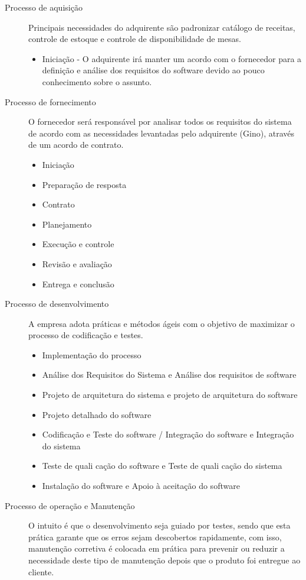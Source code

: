 \begin{description}
  \item [Processo de aquisição] Principais necessidades do adquirente são padronizar catálogo de receitas, controle de estoque e controle de disponibilidade de mesas.
  \begin{itemize}
    \item Iniciação - O adquirente irá manter um acordo com o fornecedor para a definição e análise dos requisitos do software devido ao pouco conhecimento sobre o assunto.
  \end{itemize}
  \item [Processo de fornecimento] O fornecedor será responsável por analisar todos os requisitos do sistema de acordo com as necessidades levantadas pelo adquirente (Gino), através de um acordo de contrato.
  \begin{itemize}
    \item Iniciação
    \item Preparação de resposta
    \item Contrato
    \item Planejamento
    \item Execução e controle
    \item Revisão e avaliação
    \item Entrega e conclusão
  \end{itemize}
  \item [Processo de desenvolvimento] A empresa adota práticas e métodos ágeis com o objetivo de maximizar o processo de codificação e testes.
  \begin{itemize}
    \item Implementação do processo
    \item Análise dos Requisitos do Sistema e Análise dos requisitos de software
    \item Projeto de arquitetura do sistema e projeto de arquitetura do software
    \item Projeto detalhado do software
    \item Codificação e Teste do software / Integração do software e Integração do sistema
    \item Teste de quali cação do software e Teste de quali cação do sistema
    \item Instalação do software e Apoio à aceitação do software
  \end{itemize}
  \item [Processo de operação e Manutenção] O intuito é que o desenvolvimento seja guiado por testes, sendo que esta prática garante que os erros sejam descobertos rapidamente, com isso, manutenção corretiva é colocada em prática para prevenir ou reduzir a necessidade deste tipo de manutenção depois que o produto foi entregue ao cliente. 
\end{description}


